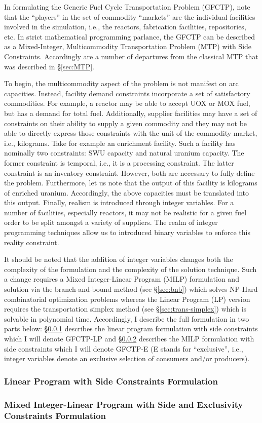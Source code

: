 In formulating the Generic Fuel Cycle Transportation Problem (GFCTP), note that
the ``players'' in the set of commodity ``markets'' are the individual
facilities involved in the simulation, i.e., the reactors, fabrication
facilities, repositories, etc. In strict mathematical programming parlance, the
GFCTP can be described as a Mixed-Integer, Multicommodity Transportation Problem
(MTP) with Side Constraints. Accordingly are a number of departures from the
classical MTP that was described in \S\ref{sec:MTP}.

To begin, the multicommodity aspect of the problem is not manifest on arc
capacities. Instead, facility demand constraints incorporate a set of
satisfactory commodities. For example, a reactor may be able to accept UOX or
MOX fuel, but has a demand for total fuel. Additionally, supplier facilities may
have a set of constraints on their ability to supply a given commodity and they
may not be able to directly express those constraints with the unit of the
commodity market, i.e., kilograms. Take for example an enrichment facility. Such
a facility has nominally two constraints: SWU capacity and natural uranium
capacity. The former constraint is temporal, i.e., it is a processing
constraint. The latter constraint is an inventory constraint. However, both are
necessary to fully define the problem. Furthermore, let us note that the output
of this facility is kilograms of enriched uranium. Accordingly, the above
capacities must be translated into this output. Finally, realism is introduced
through integer variables. For a number of facilities, especially reactors, it
may not be realistic for a given fuel order to be split amongst a variety of
suppliers. The realm of integer programming techniques allow us to introduced
binary variables to enforce this reality constraint.

It should be noted that the addition of integer variables changes both the
complexity of the formulation and the complexity of the solution technique. Such
a change requires a Mixed Integer-Linear Program (MILP) formulation and solution
via the branch-and-bound method (see \S\ref{sec:bnb}) which solves NP-Hard
combinatorial optimization problems whereas the Linear Program (LP) version
requires the transportation simplex method (see \S\ref{sec:trans-simplex})
which is solvable in polynomial time.  Accordingly, I describe the full
formulation in two parts below: \S\ref{sec:GFCTP-LP} describes the linear
program formulation with side constraints which I will denote GFCTP-LP
and \S\ref{sec:GFCTP-E} describes the MILP formulation with side constraints
which I will denote GFCTP-E (E stands for ``exclusive'', i.e., integer variables
denote an exclusive selection of consumers and/or producers).

\subsubsection{Linear Program with Side Constraints Formulation}\label{sec:GFCTP-LP}



\subsubsection{Mixed Integer-Linear Program with Side and Exclusivity Constraints Formulation}\label{sec:GFCTP-E}

%
